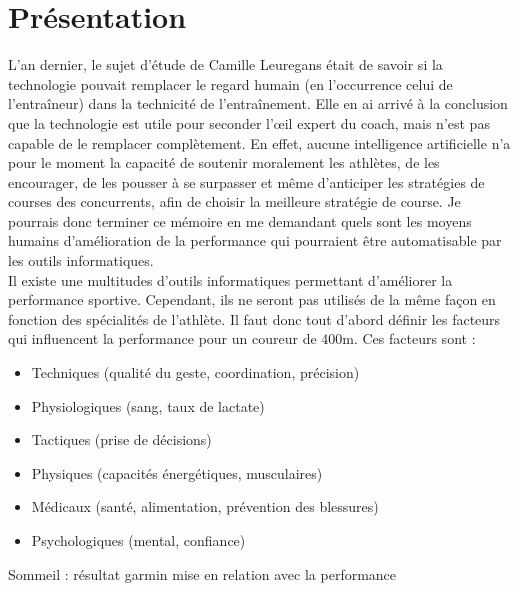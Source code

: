 \chapter*{Présentation}
\label{chap:introduction}


L'an dernier, le sujet d'étude de Camille Leuregans était de savoir si la technologie pouvait remplacer le regard humain (en l’occurrence celui de l’entraîneur) dans la technicité de l’entraînement. Elle en ai arrivé à la conclusion que la technologie est utile pour seconder l’œil expert du coach, mais n'est pas capable de le remplacer complètement. En effet, aucune intelligence artificielle n'a pour le moment la capacité de soutenir moralement les athlètes, de les encourager, de les pousser à se surpasser et même d’anticiper les stratégies de courses des concurrents, afin de choisir la meilleure stratégie de course. 
Je pourrais donc  terminer ce mémoire en me demandant quels sont les moyens humains d'amélioration de la performance qui pourraient être automatisable par les outils informatiques.\\

Il existe une multitudes d'outils informatiques permettant d'améliorer la performance sportive. Cependant, ils ne seront pas utilisés de la même façon en fonction des spécialités de l'athlète. Il faut donc tout d'abord définir les facteurs qui influencent la performance pour un coureur de 400m.
Ces facteurs sont :
\begin{itemize}
\item Techniques (qualité du geste, coordination, précision)
\item Physiologiques (sang, taux de lactate)
\item Tactiques (prise de décisions)
\item Physiques (capacités énergétiques, musculaires)
\item Médicaux (santé, alimentation, prévention des blessures)
\item Psychologiques (mental, confiance)\\

\end{itemize}

Sommeil : résultat garmin mise en relation avec la performance




